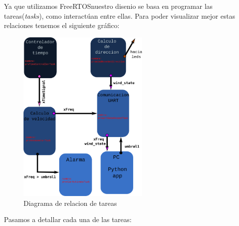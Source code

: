 \documentclass[10pt]{article}
\begin{document}
Ya que utilizamos FreeRTOS\texttrademark nuestro disenio se basa en programar las tareas(\textit{tasks}),  como interactúan entre ellas. Para poder visualizar mejor estas relaciones tenemos el siguiente gráfico:
\begin{figure}[H]
   \centering
   \includegraphics[width=0.57\textwidth]{./Images/Tasks.png}
   \caption{Diagrama de relacion de tareas}\label{fig:Task}
\end{figure}
Pasamos a detallar cada una de las tareas:
\end{document}
